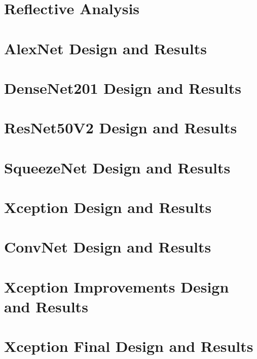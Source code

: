 \documentclass[harvard]{lincolncsthesis}
\begin{document}
\chapter{Reflective Analysis}




\printReferences


\appendix
\chapter{AlexNet Design and Results}

\chapter{DenseNet201 Design and Results}

\chapter{ResNet50V2 Design and Results}

\chapter{SqueezeNet Design and Results}

\chapter{Xception Design and Results}

\chapter{ConvNet Design and Results}

\chapter{Xception Improvements Design and Results}

\chapter{Xception Final Design and Results}

\end{document}
